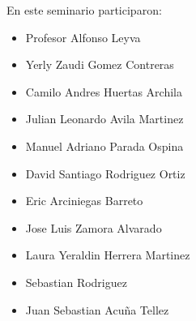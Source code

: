 En este seminario participaron:

\begin{itemize}
	\item Profesor Alfonso Leyva
	\item Yerly Zaudi Gomez Contreras
	\item Camilo Andres Huertas Archila
	\item Julian Leonardo Avila Martinez 
	\item Manuel Adriano Parada Ospina
	\item David Santiago Rodriguez Ortiz
	\item Eric Arciniegas Barreto
	\item Jose Luis Zamora Alvarado
	\item Laura Yeraldin Herrera Martinez
	\item Sebastian Rodriguez
	\item Juan Sebastian Acuña Tellez
\end{itemize}

